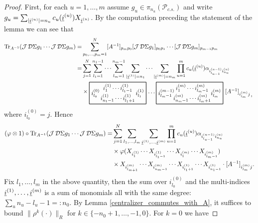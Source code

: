 \begin{proof}
First, for each $u=1,\ldots, m$  assume $g_u\in \pi_{n_u}(\mathscr{P}_{c.s.})$ and write $g_u=\sum_{|\underline{i}^{(u)}|=n_u} c_u(\underline{i}^{(u)}) X_{\underline{i}^{(u)}}$. By the computation preceding the statement of the lemma we can see that
	\begin{align*}
		\text{Tr}_{A^{-1}}( \J\D\Sigma g_1\cdots \J\D\Sigma g_m)=&\sum_{p_0,\ldots,p_m=1}^N [A^{-1}]_{p_mp_0}[\J\D\Sigma g_1]_{p_0p_1}\cdots [\J\D\Sigma g_m]_{p_{m-1}p_m}\\
			=&\sum_{j=1}^N \sum_{l_1=1}^{n_1-1}\cdots \sum_{l_m=1}^{n_m-1} \sum_{|\ul{i}^{(1)}|=n_1}\cdots \sum_{|\ul{i}^{(m)}|=n_m}\prod_{u=1}^m c_u(\ul{i}^{(u)}) \alpha_{i_{l_{u-1}}^{(u-1)}i_{n_u}^{(u)}}\\
			&\times
				\begin{tikzpicture}[baseline]
				\draw[thick] (0,-.65) rectangle (3.4,.65);
				\node at (1.7,.3) {$i_1^{(1)}\cdots i_{l_1-1}^{(1)}$};
				\node at (1.7,-.3) {$i_{n_1-1}^{(1)}\cdots i_{l_1+1}^{(1)}$};
				\node[right] at (0,0) {$i_{l_0}^{(0)}$};
				\node[left] at (3.4,0) {$i_{l_1}^{(1)}$};
				\node at (3.75,0) {$\cdots$};
				\draw[thick] (4,-.65) rectangle (8,.65);
				\node at (6.15,.3) {$i_1^{(m)}\cdots i_{l_m-1}^{(m)}$};
				\node at (6.15,-.3) {$i_{n_m-1}^{(m)}\cdots i_{l_m+1}^{(m)}$};
				\node[right] at (4,0) {$i_{l_m-1}^{(m-1)}$};
				\node[left] at (8,0) {$i_{l_m}^{(m)}$};
				\node[right] at (8,0) {$[A^{-1}]_{i_{l_m}^{(m)} j}$};
				\node at (9.7,-.2) {,};
				\end{tikzpicture}
	\end{align*}
where $i_{l_0}^{(0)}=j$. Hence
	\begin{align*}
		(\varphi\otimes 1)\circ \text{Tr}_{A^{-1}}( \operatorname{\mathcal J}\mathcal D\Sigma g_1\cdots \operatorname{\mathcal J}\mathcal D\Sigma g_m)=&\sum_{j=1}^N \sum_{l_1,\ldots,l_m}\sum_{\underline{i}^{(1)},\ldots,\underline{i}^{(m)}} \prod_{u=1}^m c_u(\underline{i}^{(u)}) \alpha_{i_{l_{u-1}}^{(u-1)} i_{n_u}^{(u)}} \\
						&\times\varphi( X_{i_1^{(1)}}\cdots X_{i_{l_1-1}^{(1)}} \cdots X_{i_1^{(m)}}\cdots X_{i_{l_m-1}^{(m)}})\\
						&\times X_{i_{l_{m+1}}^{(m)}} \cdots X_{i_{n_m-1}^{(m)}} \cdots X_{i_{l_1+1}^{(1)}} \cdots X_{i_{n_1-1}^{(1)}}\cdot [A^{-1}]_{i_{l_m}^{(m)}j}.
	\end{align*}
Fix $l_1,\ldots, l_m$ in the above quantity, then the sum over $i_{l_0}^{(0)}$ and the multi-indices $\underline{i}^{(1)},\ldots,\underline{i}^{(m)}$ is a sum of monomials all with the same degree: $\sum_u n_u-l_u-1=:n_0$. By Lemma \ref{centralizer_commutes_with_A}, it suffices to bound $\|\rho^k(\cdot)\|_R$ for $k\in\{-n_0+1,\ldots, -1,0\}$. For $k=0$ we have

\end{proof}
